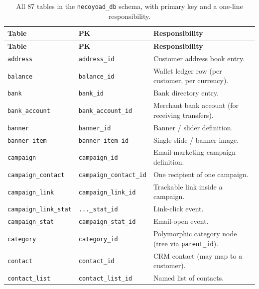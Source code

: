 \documentclass[11pt,a4paper]{article}
\begin{document}
\footnotesize\sloppy
\begin{longtable}{>{\raggedright\arraybackslash}p{4.7cm}>{\raggedright\arraybackslash}p{3.4cm}>{\raggedright\arraybackslash}p{6.3cm}}
\caption{All 87 tables in the \texttt{necoyoad\_db} schema, with primary key and a one-line responsibility.}\label{tab:inventory}\\
\toprule
\textbf{Table} & \textbf{PK} & \textbf{Responsibility} \\
\midrule
\endfirsthead
\toprule
\textbf{Table} & \textbf{PK} & \textbf{Responsibility} \\
\midrule
\endhead
\bottomrule
\endfoot
\texttt{address}                 & \texttt{address\_id}        & Customer address book entry. \\
\texttt{balance}                 & \texttt{balance\_id}        & Wallet ledger row (per customer, per currency). \\
\texttt{bank}                    & \texttt{bank\_id}           & Bank directory entry. \\
\texttt{bank\_account}           & \texttt{bank\_account\_id}  & Merchant bank account (for receiving transfers). \\
\texttt{banner}                  & \texttt{banner\_id}         & Banner / slider definition. \\
\texttt{banner\_item}            & \texttt{banner\_item\_id}   & Single slide / banner image. \\
\texttt{campaign}                & \texttt{campaign\_id}       & Email-marketing campaign definition. \\
\texttt{campaign\_contact}       & \texttt{campaign\_contact\_id} & One recipient of one campaign. \\
\texttt{campaign\_link}          & \texttt{campaign\_link\_id} & Trackable link inside a campaign. \\
\texttt{campaign\_link\_stat}    & \texttt{...\_stat\_id} & Link-click event. \\
\texttt{campaign\_stat}          & \texttt{campaign\_stat\_id} & Email-open event. \\
\texttt{category}                & \texttt{category\_id}       & Polymorphic category node (tree via \texttt{parent\_id}). \\
\texttt{contact}                 & \texttt{contact\_id}        & CRM contact (may map to a customer). \\
\texttt{contact\_list}           & \texttt{contact\_list\_id}  & Named list of contacts. \\

\end{longtable}
\end{document}
